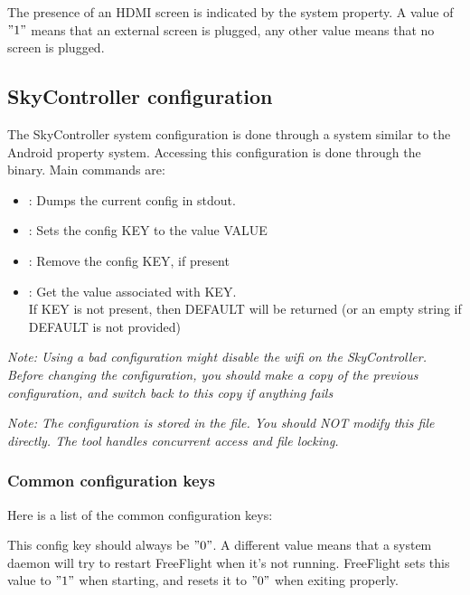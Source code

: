 The presence of an HDMI screen is indicated by the  system property. A value of $"1"$ means that an external screen is plugged, any other value means that no screen is plugged.

\newpage
\subsection{SkyController configuration}

The SkyController system configuration is done through a system similar to the Android property system. Accessing this configuration is done through the  binary. Main commands are:

\begin{itemize}
\item {} : Dumps the current config in stdout.
\item {} : Sets the config KEY to the value VALUE
\item {} : Remove the config KEY, if present
\item {} : Get the value associated with KEY. \\
If KEY is not present, then DEFAULT will be returned (or an empty string if DEFAULT is not provided)
\end{itemize}

\emph{Note: Using a bad configuration might disable the wifi on the SkyController. Before changing the configuration, you should make a copy of the previous configuration, and switch back to this copy if anything fails}

\emph{Note: The configuration is stored in the  file. You should NOT modify this file directly. The  tool handles concurrent access and file locking.}

\subsubsection{Common configuration keys}

Here is a list of the common configuration keys:


This config key should always be $"0"$. A different value means that a system daemon will try to restart FreeFlight when it's not running. FreeFlight sets this value to $"1"$ when starting, and resets it to $"0"$ when exiting properly.


